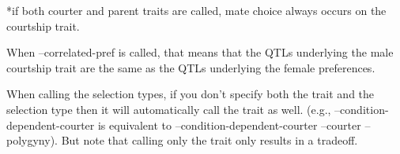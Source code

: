 \documentclass[]{article}
\begin{document}
*if both courter and parent traits are called, mate choice always occurs on the courtship trait.

When --correlated-pref is called, that means that the QTLs underlying the male courtship trait are the same as the QTLs underlying the female preferences.

When calling the selection types, if you don't specify both the trait and the selection type then it will automatically call the trait as well. (e.g., --condition-dependent-courter is equivalent to --condition-dependent-courter --courter --polygyny). But note that calling only the trait only results in a tradeoff. 
 
\end{document}
